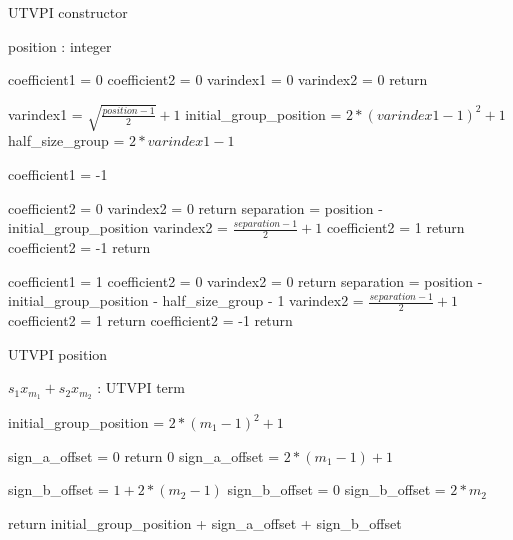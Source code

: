 \begin{algorithm}[!ht]
  \caption{UTVPI constructor}
  \linespread{\separationline}\selectfont
  \begin{algorithmic}[2]
     {position : integer}

    \State coefficient1 = 0
    \State coefficient2 = 0
    \State varindex1 = 0
    \State varindex2 = 0
    \State return
    \EndIf

    \State varindex1 = $\sqrt{\frac{position - 1}{2}} + 1$
    \State initial\_group\_position = $2*(varindex1-1)^2 + 1$
    \State half\_size\_group = $2*varindex1-1$

    \State coefficient1 = -1

    \State coefficient2 = 0
    \State varindex2 = 0
    \State return
    \EndIf
    \State separation = position - initial\_group\_position
    \State varindex2 = $\frac{separation - 1}{2} + 1$
    \State coefficient2 = 1
    \State return
    \EndIf
    \State coefficient2 = -1
    \State return
    \EndIf

    \State coefficient1 = 1
    \State coefficient2 = 0
    \State varindex2 = 0
    \State return
    \EndIf
    \State separation = position - initial\_group\_position - half\_size\_group - 1
    \State varindex2 = $\frac{separation - 1}{2} + 1$
    \State coefficient2 = 1
    \State return
    \EndIf
    \State coefficient2 = -1
    \State return
    \EndProcedure
  \end{algorithmic}
\end{algorithm}

\begin{algorithm}[!ht]
  \caption{UTVPI position}
  \linespread{\separationline}\selectfont
  \begin{algorithmic}[2]
     { $s_1 x_{m_1} + s_2 x_{m_2}$ : UTVPI term}

    \State initial\_group\_position = $2*(m_1 -1)^2 + 1$

    \State sign\_a\_offset = 0
    \Else
    \State return 0
    \Else
    \State sign\_a\_offset = $2*(m_1 - 1) + 1$
    \EndIf
    \EndIf
    \EndIf

    \State sign\_b\_offset = $1 + 2*(m_2 -1)$
    \Else
    \State sign\_b\_offset = 0
    \Else
    \State sign\_b\_offset = $2*m_2$
    \EndIf
    \EndIf
    \EndIf

    \State return initial\_group\_position + sign\_a\_offset + sign\_b\_offset

    \EndProcedure
  \end{algorithmic}

\end{algorithm}

